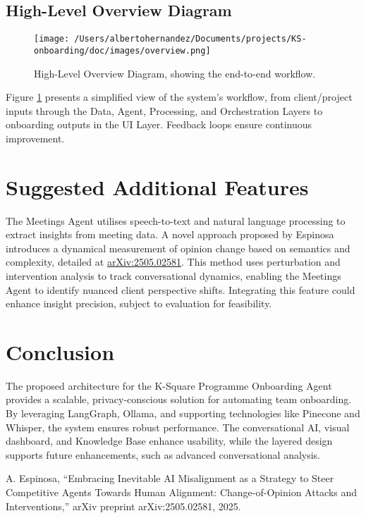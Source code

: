 \documentclass{article}
\begin{document}
\subsection{High-Level Overview Diagram}
\begin{figure}[p]
    \centering
    \texttt{[image: /Users/albertohernandez/Documents/projects/KS-onboarding/doc/images/overview.png]}
    \caption{High-Level Overview Diagram, showing the end-to-end workflow.}
    \label{fig:overview}
\end{figure}
Figure \ref{fig:overview} presents a simplified view of the system’s workflow, from client/project inputs through the Data, Agent, Processing, and Orchestration Layers to onboarding outputs in the UI Layer. Feedback loops ensure continuous improvement.

\section{Suggested Additional Features}
The Meetings Agent utilises speech-to-text and natural language processing to extract insights from meeting data. A novel approach proposed by Espinosa \cite{espinosa2025} introduces a dynamical measurement of opinion change based on semantics and complexity, detailed at \href{https://arxiv.org/abs/2505.02581}{arXiv:2505.02581}. This method uses perturbation and intervention analysis to track conversational dynamics, enabling the Meetings Agent to identify nuanced client perspective shifts. Integrating this feature could enhance insight precision, subject to evaluation for feasibility.

\section{Conclusion}
The proposed architecture for the K-Square Programme Onboarding Agent provides a scalable, privacy-conscious solution for automating team onboarding. By leveraging LangGraph, Ollama, and supporting technologies like Pinecone and Whisper, the system ensures robust performance. The conversational AI, visual dashboard, and Knowledge Base enhance usability, while the layered design supports future enhancements, such as advanced conversational analysis.

\begin{thebibliography}{1}
A. Espinosa, ``Embracing Inevitable AI Misalignment as a Strategy to Steer Competitive Agents Towards Human Alignment: Change-of-Opinion Attacks and Interventions,'' arXiv preprint arXiv:2505.02581, 2025.
\end{thebibliography}

\end{document}
